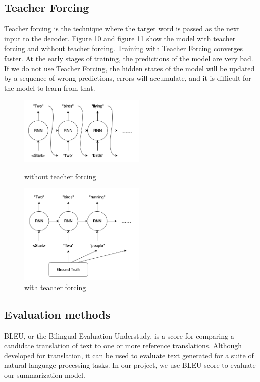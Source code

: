 \documentclass{article}
\begin{document}
\subsection{Teacher Forcing}
Teacher forcing is the technique where the target word is passed as the next input to the decoder. Figure 10 and figure 11 show the model with teacher forcing and without teacher forcing. Training with Teacher Forcing converges faster. At the early stages of training, the predictions of the model are very bad. If we do not use Teacher Forcing, the hidden states of the model will be updated by a sequence of wrong predictions, errors will accumulate, and it is difficult for the model to learn from that.

\begin{figure}[htbp]
\centering
\begin{minipage}[t]{0.48\textwidth}
\centering
\includegraphics[width=6cm]{with_teacher_forcing.png}
\caption{without teacher forcing}
\end{minipage}
\begin{minipage}[t]{0.48\textwidth}
\centering
\includegraphics[width=6cm]{without_teacher_forcing.png}
\caption{with teacher forcing}
\end{minipage}
\end{figure}

\subsection{Evaluation methods}
BLEU, or the Bilingual Evaluation Understudy, is a score for comparing a candidate translation of text to one or more reference translations. Although developed for translation, it can be used to evaluate text generated for a suite of natural language processing tasks. In our project, we use BLEU score to evaluate our summarization model.
\end{document}
